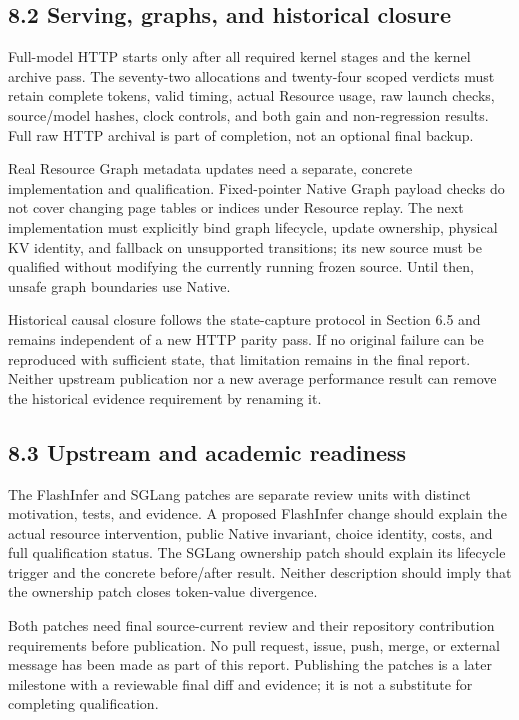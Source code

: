 \documentclass[11pt,a4paper]{article}
\begin{document}
\subsection*{8.2 Serving, graphs, and historical closure}

Full-model HTTP starts only after all required kernel stages and the kernel archive pass. The seventy-two allocations and twenty-four scoped verdicts must retain complete tokens, valid timing, actual Resource usage, raw launch checks, source/\allowbreak{}model hashes, clock controls, and both gain and non-regression results. Full raw HTTP archival is part of completion, not an optional final backup.


Real Resource Graph metadata updates need a separate, concrete implementation and qualification. Fixed-pointer Native Graph payload checks do not cover changing page tables or indices under Resource replay. The next implementation must explicitly bind graph lifecycle, update ownership, physical KV identity, and fallback on unsupported transitions; its new source must be qualified without modifying the currently running frozen source. Until then, unsafe graph boundaries use Native.


Historical causal closure follows the state-capture protocol in Section 6.5 and remains independent of a new HTTP parity pass. If no original failure can be reproduced with sufficient state, that limitation remains in the final report. Neither upstream publication nor a new average performance result can remove the historical evidence requirement by renaming it.


\subsection*{8.3 Upstream and academic readiness}

The FlashInfer and SGLang patches are separate review units with distinct motivation, tests, and evidence. A proposed FlashInfer change should explain the actual resource intervention, public Native invariant, choice identity, costs, and full qualification status. The SGLang ownership patch should explain its lifecycle trigger and the concrete before/\allowbreak{}after result. Neither description should imply that the ownership patch closes token-value divergence.


Both patches need final source-current review and their repository contribution requirements before publication. No pull request, issue, push, merge, or external message has been made as part of this report. Publishing the patches is a later milestone with a reviewable final diff and evidence; it is not a substitute for completing qualification.
\end{document}

